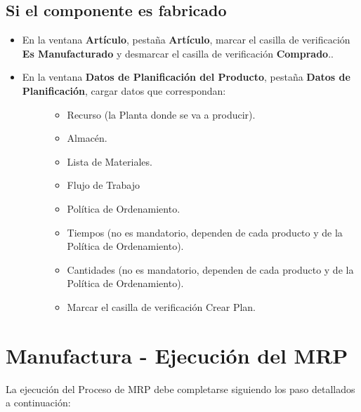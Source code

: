 \documentclass[letterpaper,10pt,spanish]{sphinxmanual}
\begin{document}
\subsection{Si el componente es fabricado}
\label{manufactura-checklist:si-el-componente-es-fabricado}\begin{itemize}
\item {} 
En la ventana \textbf{Artículo}, pestaña \textbf{Artículo}, marcar el casilla de verificación \textbf{Es Manufacturado} y desmarcar el casilla de verificación \textbf{Comprado}..

\item {} \begin{description}
\item[{En la ventana \textbf{Datos de Planificación del Producto}, pestaña \textbf{Datos de Planificación}, cargar datos que correspondan:}] \leavevmode\begin{itemize}
\item {} 
Recurso (la Planta donde se va a producir).

\item {} 
Almacén.

\item {} 
Lista de Materiales.

\item {} 
Flujo de Trabajo

\item {} 
Política de Ordenamiento.

\item {} 
Tiempos (no es mandatorio, dependen de cada producto y de la Política de Ordenamiento).

\item {} 
Cantidades (no es mandatorio, dependen de cada producto y de la Política de Ordenamiento).

\item {} 
Marcar el casilla de verificación Crear Plan.

\end{itemize}

\end{description}

\end{itemize}


\section{Manufactura - Ejecución del MRP}
\label{manufactura-proceso:manufactura-ejecucion-del-mrp}\label{manufactura-proceso::doc}
La ejecución del Proceso de MRP debe completarse siguiendo los paso detallados a continuación:
\end{document}
